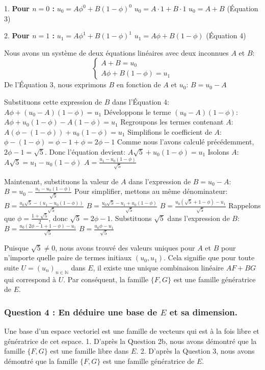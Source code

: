 \documentclass{report}
\begin{document}
1.  \textbf{Pour $n=0$ :}
    $u_0 = A \phi^0 + B (1-\phi)^0$
    $u_0 = A \cdot 1 + B \cdot 1$
    $u_0 = A + B$ (Équation 3)

2.  \textbf{Pour $n=1$ :}
    $u_1 = A \phi^1 + B (1-\phi)^1$
    $u_1 = A \phi + B (1-\phi)$ (Équation 4)

Nous avons un système de deux équations linéaires avec deux inconnues $A$ et $B$:
$$ \begin{cases} A + B = u_0 \\ A \phi + B (1-\phi) = u_1 \end{cases} $$
De l'Équation 3, nous exprimons $B$ en fonction de $A$ et $u_0$:
$B = u_0 - A$

Substituons cette expression de $B$ dans l'Équation 4:
$A \phi + (u_0 - A)(1-\phi) = u_1$
Développons le terme $(u_0 - A)(1-\phi)$:
$A \phi + u_0(1-\phi) - A(1-\phi) = u_1$
Regroupons les termes contenant $A$:
$A (\phi - (1-\phi)) + u_0(1-\phi) = u_1$
Simplifions le coefficient de $A$:
$\phi - (1-\phi) = \phi - 1 + \phi = 2\phi - 1$
Comme nous l'avons calculé précédemment, $2\phi - 1 = \sqrt{5}$.
Donc l'équation devient:
$A \sqrt{5} + u_0(1-\phi) = u_1$
Isolons $A$:
$A \sqrt{5} = u_1 - u_0(1-\phi)$
$A = \frac{u_1 - u_0(1-\phi)}{\sqrt{5}}$

Maintenant, substituons la valeur de $A$ dans l'expression de $B = u_0 - A$:
$B = u_0 - \frac{u_1 - u_0(1-\phi)}{\sqrt{5}}$
Pour simplifier, mettons au même dénominateur:
$B = \frac{u_0 \sqrt{5} - (u_1 - u_0(1-\phi))}{\sqrt{5}}$
$B = \frac{u_0 \sqrt{5} - u_1 + u_0(1-\phi)}{\sqrt{5}}$
$B = \frac{u_0 (\sqrt{5} + 1 - \phi) - u_1}{\sqrt{5}}$
Rappelons que $\phi = \frac{1+\sqrt{5}}{2}$, donc $\sqrt{5} = 2\phi - 1$.
Substituons $\sqrt{5}$ dans l'expression de $B$:
$B = \frac{u_0 (2\phi - 1 + 1 - \phi) - u_1}{\sqrt{5}}$
$B = \frac{u_0 \phi - u_1}{\sqrt{5}}$

Puisque $\sqrt{5} \neq 0$, nous avons trouvé des valeurs uniques pour $A$ et $B$ pour n'importe quelle paire de termes initiaux $(u_0, u_1)$.
Cela signifie que pour toute suite $U = (u_n)_{n \in \mathbb{N}}$ dans $E$, il existe une unique combinaison linéaire $A F + B G$ qui correspond à $U$.
Par conséquent, la famille $\{F, G\}$ est une famille génératrice de $E$.

\subsubsection*{Question 4 : En déduire une base de $E$ et sa dimension.}

Une base d'un espace vectoriel est une famille de vecteurs qui est à la fois libre et génératrice de cet espace.
1.  D'après la Question 2b, nous avons démontré que la famille $\{F, G\}$ est une famille libre dans $E$.
2.  D'après la Question 3, nous avons démontré que la famille $\{F, G\}$ est une famille génératrice de $E$.
\end{document}

